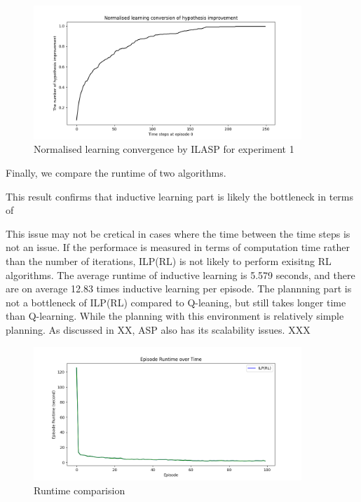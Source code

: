 \begin{figure}[!htb]
\centering
\includegraphics[width=0.9\textwidth]{./figures/experiment1_ilasp}
\caption{Normalised learning convergence by ILASP for experiment 1}
\label{experiment1_ilasp}
\end{figure}

Finally, we compare the runtime of two algorithms. 

This result confirms that inductive learning part is likely the bottleneck in terms of 

This issue may not be cretical in cases where the time between the time steps is not an issue. If the performace is measured in terms of computation time rather than the number of iterations, 
ILP(RL) is not likely to perform exisitng RL algorithms. 
The average runtime of inductive learning is 5.579 seconds, and there are on average 12.83 times inductive learning per episode. 
The plannning part is not a bottleneck of ILP(RL) compared to Q-leaning, but still takes longer time than Q-learning. While the planning with this environment is relatively simple planning. 
As discussed in XX, ASP also has its scalability issues. XXX

\begin{figure}[!htb]
\centering
\includegraphics[width=0.9\textwidth]{./figures/experiment1_runtime}
\caption{Runtime comparision}
\label{experiment1}
\end{figure}

